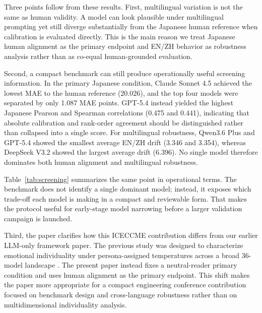 Three points follow from these results. First, multilingual variation is not the same as human validity. A model can look plausible under multilingual prompting yet still diverge substantially from the Japanese human reference when calibration is evaluated directly. This is the main reason we treat Japanese human alignment as the primary endpoint and EN/ZH behavior as robustness analysis rather than as co-equal human-grounded evaluation.

Second, a compact benchmark can still produce operationally useful screening information. In the primary Japanese condition, Claude Sonnet 4.5 achieved the lowest MAE to the human reference (20.026), and the top four models were separated by only 1.087 MAE points. GPT-5.4 instead yielded the highest Japanese Pearson and Spearman correlations (0.475 and 0.441), indicating that absolute calibration and rank-order agreement should be distinguished rather than collapsed into a single score. For multilingual robustness, Qwen3.6 Plus and GPT-5.4 showed the smallest average EN/ZH drift (3.346 and 3.354), whereas DeepSeek V3.2 showed the largest average drift (6.396). No single model therefore dominates both human alignment and multilingual robustness.

\begin{table}[t]
\caption{Practical screening interpretation of the six-model panel.}
\label{tab:screening}
\centering
\scriptsize

\end{table}

Table~\ref{tab:screening} summarizes the same point in operational terms. The benchmark does not identify a single dominant model; instead, it exposes which trade-off each model is making in a compact and reviewable form. That makes the protocol useful for early-stage model narrowing before a larger validation campaign is launched.

Third, the paper clarifies how this ICECCME contribution differs from our earlier LLM-only framework paper. The previous study was designed to characterize emotional individuality under persona-assigned temperatures across a broad 36-model landscape \cite{shirahama2026mdpi}. The present paper instead fixes a neutral-reader primary condition and uses human alignment as the primary endpoint. This shift makes the paper more appropriate for a compact engineering conference contribution focused on benchmark design and cross-language robustness rather than on multidimensional individuality analysis.

